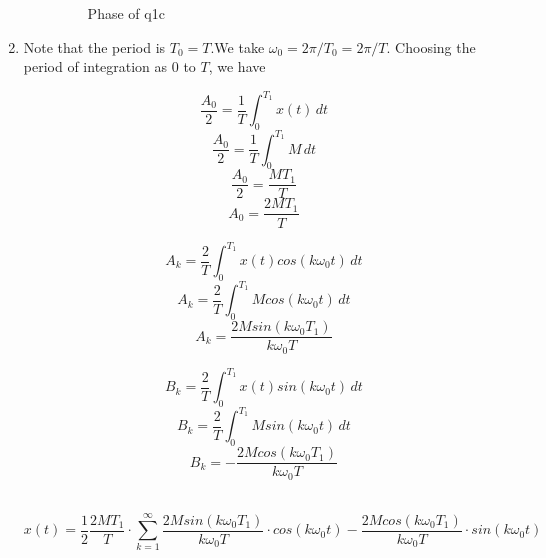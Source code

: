\documentclass[10pt,a4paper, margin=1in]{article}
\begin{document}
\begin{enumerate}
\begin{enumerate}
       
    \begin{figure} [H]
        \centering
        \caption{Phase of q1c}
        \label{fig:q1cp}
    \end{figure}
    
    \end{enumerate}

\item %
    Note that the period is $T_0 = T$.We take $\omega_0 = 2\pi / T_0 = 2\pi / T$. Choosing the period of integration as $0$ to $T$, we have
    
    
    \[ \frac{A_0}{2} = \frac{1}{T} \int_{0}^{T_1} x(t) \,dt \]
    \[ \frac{A_0}{2} = \frac{1}{T} \int_{0}^{T_1} M \,dt \]
    \[ \frac{A_0}{2} = \frac{M T_1}{T} \]
    \[ A_0 = \frac{2M T_1}{T} \]

    \[ A_k = \frac{2}{T} \int_{0}^{T_1} x(t) cos(k \omega_0 t) \,dt \]
    \[ A_k = \frac{2}{T} \int_{0}^{T_1} M cos(k \omega_0 t) \,dt \]
    \[ A_k = \frac{2M sin(k \omega_0 T_1)}{k \omega_0 T} \]
    
    \[ B_k = \frac{2}{T} \int_{0}^{T_1} x(t) sin(k \omega_0 t) \,dt \]
    \[ B_k = \frac{2}{T} \int_{0}^{T_1} M sin(k \omega_0 t) \,dt \]
    \[ B_k = - \frac{2M cos(k \omega_0 T_1)}{k \omega_0 T} \]
    
    ~ \\
    
    \[ x(t) = \frac{1}{2} \frac{2M T_1}{T} \cdot \sum_{k=1}^{\infty} \frac{2M sin(k \omega_0 T_1)}{k \omega_0 T} \cdot cos(k \omega_0 t) - \frac{2M cos(k \omega_0 T_1)}{k \omega_0 T} \cdot sin(k \omega_0 t) \]
    

\end{enumerate}
\end{document}
